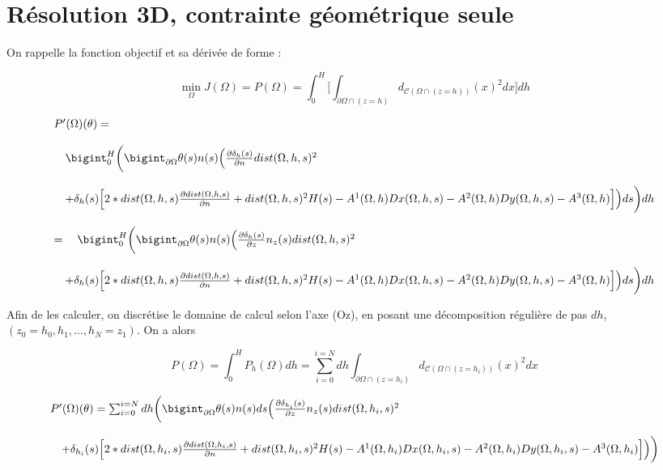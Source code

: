 \documentclass[11pt,a4paper]{article}
\begin{document}
\section*{Résolution 3D, contrainte géométrique seule}

On rappelle la fonction objectif et sa dérivée de forme :

\begin{equation}
\label{eq:constraint3}
\min_{\Omega}J(\Omega)=P(\Omega)=\int_{0}^{H}\Bigg[\int_{\partial\Omega\cap (z=h)}d_{\mathcal{C}(\Omega\cap (z=h))}(x)^2dx\Bigg]dh
\end{equation}

\begin{equation}
\begin{array}{l}
P'(\Omega)(\theta)= \\
\\
\quad \bigint_0^H\bigg(\bigint_{\partial\Omega}
\theta(s)n(s)\Big(\frac{\partial\delta_h(s)}{\partial n}dist(\Omega,h,s)^2\\
\\
\quad +\delta_h(s)\Big[2*dist(\Omega,h,s)\frac{\partial dist(\Omega,h,s)}{\partial n}+dist(\Omega,h,s)^2H(s)-A^1(\Omega,h)Dx(\Omega,h,s)-A^2(\Omega,h)Dy(\Omega,h,s)-A^3(\Omega,h)\Big]\Big) ds\bigg)dh\\
\\
=\quad \bigint_0^H\bigg(\bigint_{\partial\Omega}
\theta(s)n(s)\Big(\frac{\partial\delta_h(s)}{\partial z}n_z(s)dist(\Omega,h,s)^2\\
\\
\quad +\delta_h(s)\Big[2*dist(\Omega,h,s)\frac{\partial dist(\Omega,h,s)}{\partial n}+dist(\Omega,h,s)^2H(s)-A^1(\Omega,h)Dx(\Omega,h,s)-A^2(\Omega,h)Dy(\Omega,h,s)-A^3(\Omega,h)\Big]\Big) ds\bigg)dh\\
\end{array}
\end{equation}

Afin de les calculer, on discrétise le domaine de calcul selon l'axe (Oz), en posant une décomposition régulière de pas $dh$, $(z_0=h_0,h_1,...,h_N=z_1)$. On a alors 

\begin{equation}
\label{eq:constraintdisc}
P(\Omega)=\int_{0}^{H}P_h(\Omega)dh=\sum_{i=0}^{i=N}dh\int_{\partial\Omega\cap (z=h_i)}d_{\mathcal{C}(\Omega\cap (z=h_i))}(x)^2dx
\end{equation}

\begin{equation}
\begin{array}{l}
P'(\Omega)(\theta)=\sum_{i=0}^{i=N}dh\bigg(\bigint_{\partial\Omega}
\theta(s)n(s)ds\Big(\frac{\partial\delta_{h_i}(s)}{\partial z}n_z(s)dist(\Omega,h_i,s)^2\\
\\
\quad +\delta_{h_i}(s)\Big[2*dist(\Omega,h_i,s)\frac{\partial dist(\Omega,h_i,s)}{\partial n}+dist(\Omega,h_i,s)^2H(s)-A^1(\Omega,h_i)Dx(\Omega,h_i,s)-A^2(\Omega,h_i)Dy(\Omega,h_i,s)-A^3(\Omega,h_i)\Big]\Big)\bigg)\\
\end{array}
\end{equation}
\end{document}

